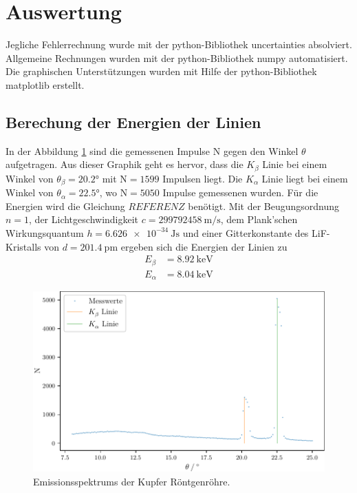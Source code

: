 \section{Auswertung}
\label{sec:Auswertung}
Jegliche Fehlerrechnung wurde mit der python-Bibliothek uncertainties \cite{uncertainties} absolviert.
Allgemeine Rechnungen wurden mit der python-Bibliothek numpy \cite{numpy} automatisiert. 
Die graphischen Unterstützungen wurden mit Hilfe der python-Bibliothek matplotlib \cite{matplotlib} erstellt.\\
\subsection{Berechung der Energien der Linien} \label{sec:energy}
In der Abbildung \ref{fig:copper} sind die gemessenen Impulse N gegen den Winkel $\theta$ aufgetragen.
Aus dieser Graphik geht es hervor, dass die $K_\beta$ Linie bei einem Winkel von $\theta_\beta = \ang{20.2;;}$ mit 
N$=1599$ Impulsen liegt.
Die $K_\alpha$ Linie liegt bei einem Winkel von $\theta_\alpha = \ang{22.5;;}$, wo
N$=5050$ Impulse gemessenen wurden.
Für die Energien wird die Gleichung $REFERENZ$ benötigt.
Mit der Beugungsordnung $n = 1$, der Lichtgeschwindigkeit $c = \SI{299792458}{\metre\per\second}$\cite{speedoflight},
dem Plank'schen Wirkungsquantum $h = \SI{6.626e-34}{\joule\second}$\cite{plank}
und einer Gitterkonstante des LiF-Kristalls von $d=\SI{201.4}{\pico\metre}$ ergeben sich die Energien der Linien zu
\begin{align*}
    E_\beta &=\SI{8.92}{\kilo\electronvolt} \\
    E_\alpha&=\SI{8.04}{\kilo\electronvolt} 
\end{align*}
\begin{figure}
    \centering
    \caption{Emissionsspektrums der Kupfer Röntgenröhre.}
    \label{fig:copper}
    \includegraphics{build/copper.pdf}
\end{figure}
\FloatBarrier
